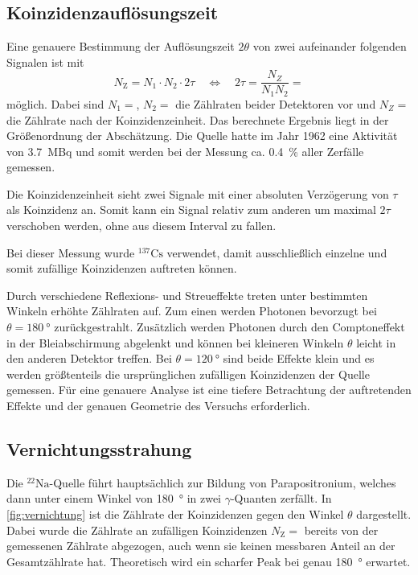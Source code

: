 \subsection{Koinzidenzauflösungszeit}
	
	Eine genauere Bestimmung der Auflösungszeit $2\theta$ von zwei aufeinander folgenden Signalen ist mit
	\begin{equation}
		N_\text{Z} = N_1 \cdot N_2 \cdot 2\tau \quad \Leftrightarrow \quad  2\tau = \frac{N_Z}{N_1 N_2} = 
	\end{equation}
	möglich.
	Dabei sind $N_1 = $, $N_2 = $ die Zählraten beider Detektoren vor und $N_Z = $ die Zählrate nach der Koinzidenzeinheit.
	Das berechnete Ergebnis liegt in der Größenordnung der Abschätzung.
	Die Quelle hatte im Jahr 1962 eine Aktivität von \SI{3.7}{\mega\becquerel} und somit werden bei der Messung ca. \SI{0.4}{\%} aller Zerfälle gemessen.

	Die Koinzidenzeinheit sieht zwei Signale mit einer absoluten Verzögerung von $\tau$ als Koinzidenz an.
	Somit kann ein Signal relativ zum anderen um maximal $2 \tau$ verschoben werden, ohne aus diesem Interval zu fallen.
	
	Bei dieser Messung wurde $^{137}\text{Cs}$ verwendet, damit ausschließlich einzelne und somit zufällige Koinzidenzen auftreten können.
	
	Durch verschiedene Reflexions- und Streueffekte treten unter bestimmten Winkeln erhöhte Zählraten auf.
	Zum einen werden Photonen bevorzugt bei $\theta = \SI{180}{\degree}$ zurückgestrahlt.
	Zusätzlich werden Photonen durch den Comptoneffekt in der Bleiabschirmung abgelenkt und können bei kleineren Winkeln $\theta$ leicht in den anderen Detektor treffen.
	Bei $\theta = \SI{120}{\degree}$ sind beide Effekte klein und es werden größtenteils die ursprünglichen zufälligen Koinzidenzen der Quelle gemessen.
	Für eine genauere Analyse ist eine tiefere Betrachtung der auftretenden Effekte und der genauen Geometrie des Versuchs erforderlich.
		
\subsection{Vernichtungsstrahung}

	Die $^{22}\text{Na}$-Quelle führt hauptsächlich zur Bildung von Parapositronium, welches dann unter einem Winkel von \SI{180}{\degree} in zwei $\gamma$-Quanten zerfällt.
	In \cref{fig:vernichtung} ist die Zählrate der Koinzidenzen gegen den Winkel $\theta$ dargestellt.
	Dabei wurde die Zählrate an zufälligen Koinzidenzen $N_\text{Z} = $ bereits von der gemessenen Zählrate abgezogen, auch wenn sie keinen messbaren Anteil an der Gesamtzählrate hat.
	Theoretisch wird ein scharfer Peak bei genau \SI{180}{\degree} erwartet.
	
